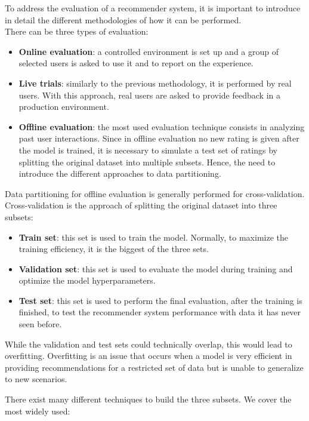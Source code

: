 To address the evaluation of a recommender system, it is important to introduce in detail the different methodologies of how it can be performed.\\
There can be three types of evaluation:
\begin{itemize}
\item \textbf{Online evaluation}: a controlled environment is set up and a group of selected users is asked to use it and to report on the experience.
\item \textbf{Live trials}: similarly to the previous methodology, it is performed by real users. With this approach, real users are asked to provide feedback in a production environment.
\item \textbf{Offline evaluation}: the most used evaluation technique consists in analyzing past user interactions. Since in offline evaluation no new rating is given after the model is trained, it is necessary to simulate a test set of ratings by splitting the original dataset into multiple subsets. Hence, the need to introduce the different approaches to data partitioning.
\end{itemize}\par
Data partitioning for offline evaluation is generally performed for cross-validation. Cross-validation is the approach of splitting the original dataset into three subsets:
\begin{itemize}
\item \textbf{Train set}: this set is used to train the model. Normally, to maximize the training efficiency, it is the biggest of the three sets.
\item \textbf{Validation set}: this set is used to evaluate the model during training and optimize the model hyperparameters.
\item \textbf{Test set}: this set is used to perform the final evaluation, after the training is finished, to test the recommender system performance with data it has never seen before.
\end{itemize}
While the validation and test sets could technically overlap, this would lead to overfitting. Overfitting is an issue that occurs when a model is very efficient in providing recommendations for a restricted set of data but is unable to generalize to new scenarios.\par
There exist many different techniques to build the three subsets. We cover the most widely used:
